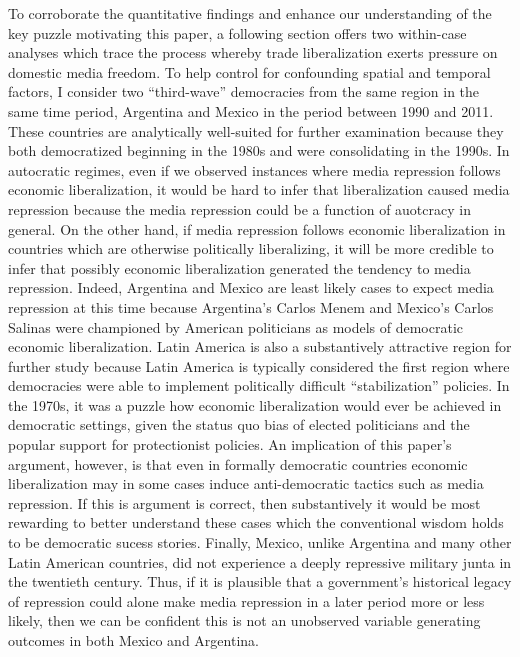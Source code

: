 \documentclass[12pt]{report}
\begin{document}
To corroborate the quantitative findings and enhance our understanding
of the key puzzle motivating this paper, a following section offers
two within-case analyses which trace the process whereby trade liberalization
exerts pressure on domestic media freedom. To help control for confounding
spatial and temporal factors, I consider two ``third-wave''
democracies from the same region in the same time period, Argentina
and Mexico in the period between 1990 and 2011. These countries are
analytically well-suited for further examination because they both
democratized beginning in the 1980s and were consolidating in the
1990s. In autocratic regimes, even if we observed instances where
media repression follows economic liberalization, it would be hard
to infer that liberalization caused media repression because the media
repression could be a function of auotcracy in general. On the other
hand, if media repression follows economic liberalization in countries
which are otherwise politically liberalizing, it will be more credible
to infer that possibly economic liberalization generated the tendency
to media repression. Indeed, Argentina and Mexico are least likely
cases to expect media repression at this time because Argentina's
Carlos Menem and Mexico's Carlos Salinas were championed by American
politicians as models of democratic economic liberalization. Latin
America is also a substantively attractive region for further study
because Latin America is typically considered the first region where
democracies were able to implement politically difficult ``stabilization''
policies. In the 1970s, it was a puzzle how economic liberalization
would ever be achieved in democratic settings, given the status quo
bias of elected politicians and the popular support for protectionist
policies. An implication of this paper's argument, however, is that
even in formally democratic countries economic liberalization may
in some cases induce anti-democratic tactics such as media repression.
If this is argument is correct, then substantively it would be most
rewarding to better understand these cases which the conventional
wisdom holds to be democratic sucess stories. Finally, Mexico, unlike
Argentina and many other Latin American countries, did not experience
a deeply repressive military junta in the twentieth century. Thus,
if it is plausible that a government's historical legacy of repression
could alone make media repression in a later period more or less likely,
then we can be confident this is not an unobserved variable generating
outcomes in both Mexico and Argentina.
\end{document}
